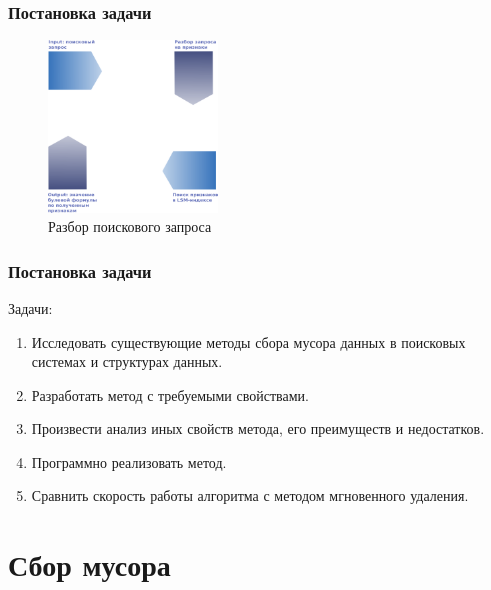 \documentclass[aspectratio=169, pdf, 8pt, unicode]{beamer}
\begin{document}
\begin{frame}[fragile]
\frametitle{Постановка задачи}
\begin{figure}[H]
\centering
\includegraphics[width=0.4\textwidth]{fig/parser.png}
\caption{Разбор поискового запроса}
\end{figure}
\end{frame}

\begin{frame}[fragile]
    \frametitle{Постановка задачи}
    {\large Задачи:}
    \vspace{5mm}
    \begin{enumerate}
    \item Исследовать существующие методы сбора мусора данных в поисковых системах и структурах данных.
    \vspace{5mm}
    \item Разработать метод с требуемыми свойствами.
    \vspace{5mm}
    \item Произвести анализ иных свойств метода, его преимуществ и недостатков.
    \vspace{5mm}
    \item Программно реализовать метод.
    \vspace{5mm}
    \item Сравнить скорость работы алгоритма с методом мгновенного удаления.
    \end{enumerate}
    \end{frame}

\section{Сбор мусора}
\end{document}
